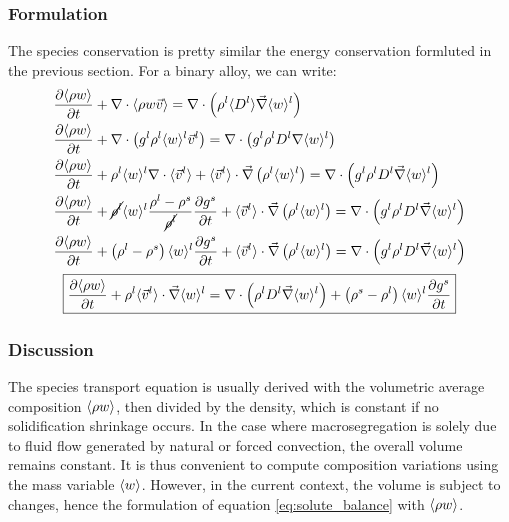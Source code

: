 \subsubsection{Formulation}
The species conservation is pretty similar the energy conservation formluted in the previous section. For a binary alloy, we can write:
\begin{subequations}
\begin{align}
	& \frac{\partial \langle \rho w \rangle}{\partial t} + \nabla \cdot \langle \rho w \vec{v} \rangle 
	= \nabla  \cdot \left( \rho^l \langle D^l \rangle \vec{\nabla} \langle w \rangle^l  \right) \\
	& \frac{\partial \langle \rho w \rangle}{\partial t} + \nabla \cdot \left( {g^l} \rho^l \langle w \rangle^l \vec{v}^l \right)
	= \nabla  \cdot \left( {g^l}\rho^l D^l \nabla \langle w \rangle^l  \right) \\ 
	& \frac{\partial \langle \rho w \rangle}{\partial t} 
		+ \rho^l \langle w \rangle^l  \nabla \cdot \langle \vec{v}^l \rangle
		+ \langle \vec{v}^l \rangle \cdot \vec{\nabla} \left( \rho^l \langle w \rangle^l \right)
		= \nabla  \cdot \left( {g^l} \rho^l D^l \vec{\nabla} \langle w \rangle^l  \right) \\   
	& \frac{\partial \langle \rho w \rangle}{\partial t} 
		+ \cancel{\rho^l} \langle w \rangle^l  \frac{\rho^l-\rho^s}{\cancel{\rho^l}} \frac{\partial  {g^s} }{\partial t}
		+ \langle \vec{v}^l \rangle \cdot \vec{\nabla} \left( \rho^l \langle w \rangle^l \right)
		= \nabla  \cdot \left( {g^l} \rho^l D^l \vec{\nabla} \langle w \rangle^l  \right) \\ 
	& \frac{\partial \langle \rho w \rangle}{\partial t} 
		+ \left( \rho^l-\rho^s \right) \langle w \rangle^l \frac{\partial  {g^s} }{\partial t}
		+ \langle \vec{v}^l \rangle \cdot \vec{\nabla} \left( \rho^l \langle w \rangle^l \right)
		= \nabla  \cdot \left( {g^l} \rho^l D^l \vec{\nabla} \langle w \rangle^l  \right)        
\end{align}
\end{subequations}
\begin{align}
\label{eq:solute_balance}
 \boxed{ \frac{\partial \langle \rho w \rangle}{\partial t} 
		+ \rho^l \langle \vec{v}^l \rangle \cdot \vec{\nabla} \langle w \rangle^l
		= \nabla  \cdot \left( \rho^l D^l \vec{\nabla} \langle w \rangle^l  \right)
		+ \left( \rho^s-\rho^l \right) \langle w \rangle^l \frac{\partial  {g^s}}{\partial t}}
\end{align}
\subsubsection{Discussion}
The species transport equation is usually derived with the volumetric average composition $\langle \rho w \rangle$, then
divided by the density, which is constant if no solidification shrinkage occurs. In the case where macrosegregation
is solely due to fluid flow generated by natural or forced convection, the overall
volume remains constant. It is thus convenient to compute composition variations using the mass variable $\langle w \rangle$.
However, in the current context, the volume is subject to changes, hence the formulation of equation 
\eqref{eq:solute_balance} with $\langle \rho w \rangle$.

